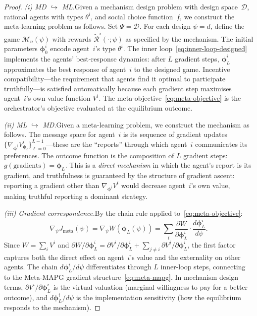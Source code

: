 \begin{proof}
\emph{(i) MD $\hookrightarrow$ ML.}\quad Given a mechanism design problem with design space~$\mathcal{D}$, rational agents with types $\theta^i$, and social choice function~$f$, we construct the meta-learning problem as follows. Set $\Psi = \mathcal{D}$. For each design $\psi = d$, define the game $\mathcal{M}_n(\psi)$ with rewards $\tilde{\mathcal{R}}^i(\cdot;\psi)$ as specified by the mechanism. The initial parameters $\bm{\phi}_0^i$ encode agent~$i$'s type $\theta^i$. The inner loop~\eqref{eq:inner-loop-designed} implements the agents' best-response dynamics: after $L$ gradient steps, $\bm{\phi}_L^i$ approximates the best response of agent~$i$ to the designed game. Incentive compatibility---the requirement that agents find it optimal to participate truthfully---is satisfied automatically because each gradient step maximises agent~$i$'s own value function $V^i$. The meta-objective~\eqref{eq:meta-objective} is the orchestrator's objective evaluated at the equilibrium outcome.

\emph{(ii) ML $\hookrightarrow$ MD.}\quad Given a meta-learning problem, we construct the mechanism as follows. The message space for agent~$i$ is its sequence of gradient updates $\{\nabla_{\bm{\phi}^i} V^i_{\bm{\phi}_\ell}\}_{\ell=0}^{L-1}$---these are the ``reports'' through which agent~$i$ communicates its preferences. The outcome function is the composition of $L$ gradient steps: $g(\text{gradients}) = \bm{\phi}_L$. This is a \emph{direct mechanism} in which the agent's report is its gradient, and truthfulness is guaranteed by the structure of gradient ascent: reporting a gradient other than $\nabla_{\bm{\phi}^i} V^i$ would decrease agent~$i$'s own value, making truthful reporting a dominant strategy.

\emph{(iii) Gradient correspondence.}\quad By the chain rule applied to~\eqref{eq:meta-objective}:
\[
  \nabla_\psi J_{\mathrm{meta}}(\psi) = \nabla_\psi W(\bm{\phi}_L(\psi)) = \sum_i \frac{\partial W}{\partial \bm{\phi}_L^i}\cdot\frac{d\bm{\phi}_L^i}{d\psi}.
\]
Since $W = \sum_i V^i$ and $\partial W / \partial \bm{\phi}_L^i = \partial V^i / \partial \bm{\phi}_L^i + \sum_{j\neq i}\partial V^j / \partial \bm{\phi}_L^i$, the first factor captures both the direct effect on agent~$i$'s value and the externality on other agents. The chain $d\bm{\phi}_L^i/d\psi$ differentiates through $L$ inner-loop steps, connecting to the Meta-MAPG gradient structure~\eqref{eq:meta-mapg}. In mechanism design terms, $\partial V^i / \partial \bm{\phi}_L^i$ is the virtual valuation (marginal willingness to pay for a better outcome), and $d\bm{\phi}_L^i/d\psi$ is the implementation sensitivity (how the equilibrium responds to the mechanism).
\end{proof}

